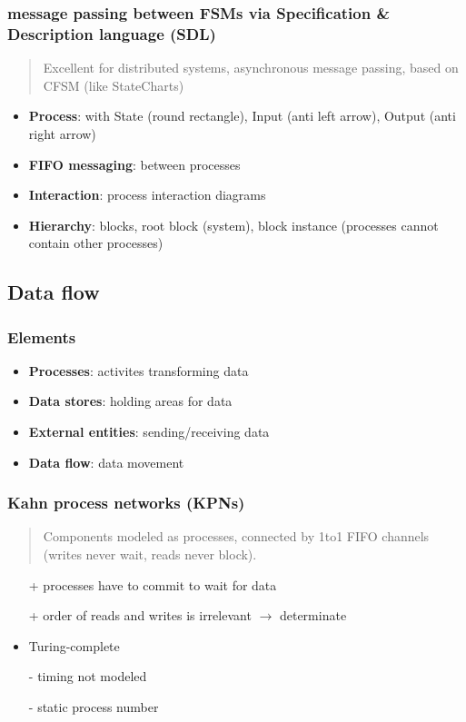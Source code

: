 \documentclass{article}
\begin{document}
\subsubsection{message passing between FSMs via Specification \& Description language (SDL)}
\begin{quote} Excellent for distributed systems, asynchronous message passing, based on CFSM (like StateCharts) \end{quote}

\begin{itemize}
  \item \textbf{Process}: with State (round rectangle), Input (anti left arrow), Output (anti right arrow)
  \item \textbf{FIFO messaging}: between processes
  \item \textbf{Interaction}: process interaction diagrams
  \item \textbf{Hierarchy}: blocks, root block (system), block instance (processes cannot contain other processes)
\end{itemize}

\subsection{Data flow}

\subsubsection{Elements}
\begin{itemize}
  \item \textbf{Processes}: activites transforming data
  \item \textbf{Data stores}: holding areas for data
  \item \textbf{External entities}: sending/receiving data
  \item \textbf{Data flow}: data movement
\end{itemize}

\subsubsection{Kahn process networks (KPNs)}
\begin{quote}Components modeled as processes, connected by 1to1 FIFO channels (writes never wait, reads never block).\end{quote}

\begin{itemize}
  \item[+] processes have to commit to wait for data
  \item[+] order of reads and writes is irrelevant $\to$ determinate
  \item Turing-complete
  \item[-] timing not modeled
  \item[-] static process number
\end{itemize}
\end{document}
